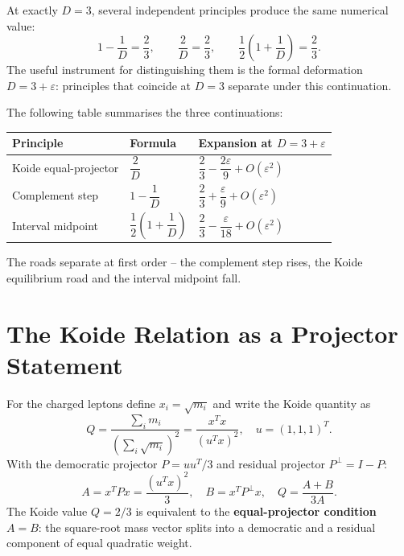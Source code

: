 At exactly \(D = 3\), several independent principles produce the same
numerical value:
\begin{equation}
  1 - \frac{1}{D} = \frac{2}{3}, \qquad
  \frac{2}{D} = \frac{2}{3}, \qquad
  \frac{1}{2}\!\left(1 + \frac{1}{D}\right) = \frac{2}{3}.
\end{equation}
The useful instrument for distinguishing them is the formal deformation
\(D = 3+\varepsilon\): principles that coincide at \(D = 3\) separate under
this continuation.

The following table summarises the three continuations:

\begin{center}
\renewcommand{\arraystretch}{1.5}
\begin{tabular}{lll}
\toprule
\textbf{Principle} & \textbf{Formula} & \textbf{Expansion at \(D=3+\varepsilon\)} \\
\midrule
Koide equal-projector & \(\dfrac{2}{D}\)
  & \(\dfrac{2}{3} - \dfrac{2\varepsilon}{9} + O(\varepsilon^2)\) \\[6pt]
Complement step & \(1 - \dfrac{1}{D}\)
  & \(\dfrac{2}{3} + \dfrac{\varepsilon}{9} + O(\varepsilon^2)\) \\[6pt]
Interval midpoint & \(\dfrac{1}{2}\!\left(1+\dfrac{1}{D}\right)\)
  & \(\dfrac{2}{3} - \dfrac{\varepsilon}{18} + O(\varepsilon^2)\) \\
\bottomrule
\end{tabular}
\end{center}

The roads separate at first order -- the complement step rises,
the Koide equilibrium road and the interval midpoint fall.

\section{The Koide Relation as a Projector Statement}

For the charged leptons define \(x_i = \sqrt{m_i}\) and write the Koide
quantity as
\begin{equation}
  Q = \frac{\sum_i m_i}{\left(\sum_i \sqrt{m_i}\right)^2}
    = \frac{x^Tx}{(u^Tx)^2},
  \quad u = (1,1,1)^T.
\end{equation}
With the democratic projector \(P = uu^T/3\) and residual projector
\(P^\perp = I - P\):
\[
  A = x^TPx = \frac{(u^Tx)^2}{3}, \quad B = x^TP^\perp x,
  \quad Q = \frac{A+B}{3A}.
\]
The Koide value \(Q = 2/3\) is equivalent to the
\textbf{equal-projector condition} \(A = B\):
the square-root mass vector splits into a democratic and a residual
component of equal quadratic weight.

